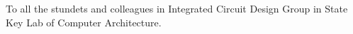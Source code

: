 
%
%
%

\begin{dedication}
To all the stundets and colleagues in Integrated Circuit Design Group in State Key Lab of Computer Architecture.
\end{dedication}




